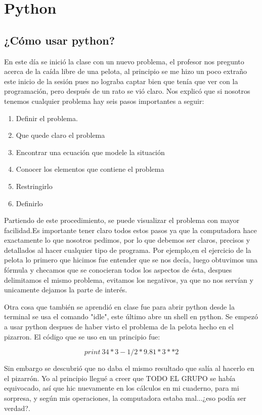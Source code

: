 \documentclass{book}
\begin{document}
	\chapter{Python}
	\section{¿Cómo usar python?}
	En este día se inició la clase con un nuevo problema, el profesor nos pregunto acerca de la caída libre de una pelota, al principio se me hizo un poco extraño este inicio de la sesión pues no lograba captar bien que tenía que ver con la programación, pero después de un rato se vió claro. 
	Nos explicó que si nosotros tenemos cualquier problema hay seis pasos importantes a seguir:
	\begin{enumerate}
		\item
		Definir el problema. 
		\item 
		Que quede claro el problema
		\item 
		Encontrar una ecuación que modele la situación
		\item 
		Conocer los elementos que contiene el problema
		\item 
		Restringirlo
		\item 
		Definirlo
	\end{enumerate}
	Partiendo de este procedimiento, se puede visualizar el problema con mayor facilidad.Es importante tener claro todos estos pasos ya que la computadora hace exactamente lo que nosotros pedimos, por lo que debemos ser claros, precisos y detallados al hacer cualquier tipo de programa.
	Por ejemplo,en el ejercicio de la pelota lo primero que hicimos fue entender que se nos decía, luego obtuvimos una fórmula y checamos que se conocieran todos los aspectos de ésta, despues delimitamos el mismo problema, evitamos los negativos, ya que no nos servían y unicamente dejamos la parte de interés.
	
	Otra cosa que también se aprendió en clase fue para abrir python desde la terminal se usa el comando "idle", este último abre un shell en python. Se empezó a usar python despues de haber visto el problema de la pelota hecho en el pizarron. El código que se uso en un principio fue:
	
	\[print\ 34*3-1/2*9.81*3**2\]
	
	Sin embargo se descubrió que no daba el mismo resultado que salía al hacerlo en el pizarrón. Yo al principio llegué a creer que TODO EL GRUPO se había equivocado, así que hic nuevamente en los cálculos en mi cuaderno, para mi sorpresa, y según mis operaciones, la computadora estaba mal...¿eso podía ser verdad?.
	
\end{document}

